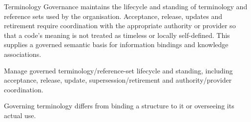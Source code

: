 Terminology Governance maintains the lifecycle and standing of terminology and reference sets used by the organisation. Acceptance, release, updates and retirement require coordination with the appropriate authority or provider so that a code's meaning is not treated as timeless or locally self-defined. This supplies a governed semantic basis for information bindings and knowledge associations.



Manage governed terminology/\allowbreak{}reference-set lifecycle and standing, including acceptance, release, update, supersession/\allowbreak{}retirement and authority/\allowbreak{}provider coordination.



Governing terminology differs from binding a structure to it or overseeing its actual use.


